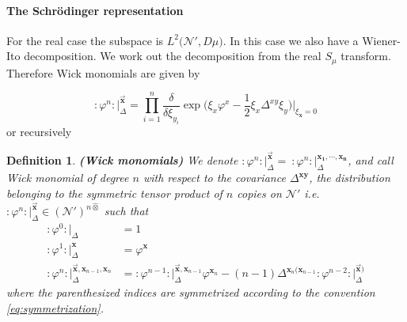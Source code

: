 \documentclass{elsarticle}%
\newtheorem{definition}{Definition}%
\begin{document}
     \paragraph*{The Schrödinger representation}
    For the real case the subspace is $L^2\big({\mathcal{N}'}, D\mu\big)$. In this case we also have a Wiener-Ito decomposition.  We work out the decomposition from the real $S_{\mu}$ transform. Therefore Wick monomials are given by 


    \begin{equation}
    \label{eq:wickMonomialsGenerator}
    :\varphi^n:\lvert_\Delta^{\vec{\mathbf{x}}}=
    \prod_{i=1}^n\frac{\delta}{\delta \xi_{y_i}}
    \exp{\big(\xi_x\varphi^x-\frac12\xi_x\Delta^{xy}\xi_y\big)} \lvert_{\xi_{\mathbf{x}}=0}
    \end{equation}
    or recursively 
\begin{definition}
    \label{def:wickMonomials}{\bf (Wick monomials)} 
    We denote $:\varphi^n:\lvert_\Delta^{\vec{\mathbf{x}}}=\ :\varphi^n:\lvert_\Delta^{\mathbf{x_1,\cdots,x_n}}$, and call Wick monomial of degree $n$ with respect to the covariance $\Delta^{\mathbf{xy}}$, the distribution belonging to the symmetric tensor product of $n$ copies on $\mathcal{N}'$ i.e. $:\varphi^n:\lvert_\Delta^{\vec{\mathbf{x}}}\in(\mathcal{N}')^{n\hat{\otimes}}$ such that
    \begin{align}
        :\varphi^0:\lvert_\Delta&=1\nonumber\\
        :\varphi^1:\lvert_\Delta^{\mathbf{x}}&=\varphi^{\mathbf{x}}\nonumber\\
        :\varphi^n:\lvert_\Delta^{\vec{\mathbf{x}},{\mathbf{x}}_{n-1},{\mathbf{x}}_n}&=
        :\varphi^{n-1}:\lvert_\Delta^{\vec{{\mathbf{x}}},{\mathbf{x}}_{n-1}}\varphi^{{\mathbf{x}}_n}-(n-1)\Delta^{\mathbf{x}_n(\mathbf{x}_{n-1}}:\varphi^{n-2}:\lvert_\Delta^{\vec{\mathbf{x}})}
        \label{eqn:wickPowers}
    \end{align}
    where the parenthesized indices are symmetrized according to the convention  \eqref{eq:symmetrization}. 
\end{definition}
\end{document}
